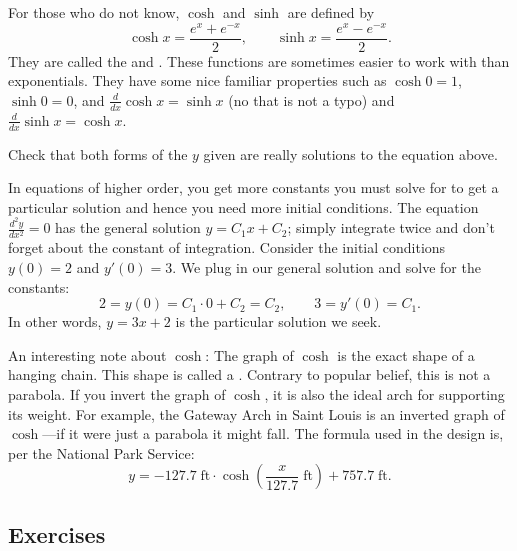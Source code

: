 For those who do not know, $\cosh$ and $\sinh$ are defined by
\begin{equation*}
\cosh x = \frac{e^{x} + e^{-x}}{2} , \qquad
\sinh x = \frac{e^{x} - e^{-x}}{2} .
\end{equation*}
They are called the
\emph{}
and
\emph{}.
These functions are sometimes easier to
work with than exponentials.  They have some nice familiar
properties such as
$\cosh 0 = 1$, $\sinh 0 = 0$, and $\frac{d}{dx} \cosh x = \sinh x$ (no that is
not a typo)
and $\frac{d}{dx} \sinh x = \cosh x$.

\begin{exercise}
Check that both forms of the $y$ given are
really solutions to the equation above.
\end{exercise}

\begin{example}
In equations of higher order, you get more constants you must solve for to
get a particular solution and hence you need more initial conditions.
The equation $\frac{d^2y}{dx^2} = 0$ has the
general solution $y = C_1 x + C_2$; simply integrate twice and don't forget
about the constant of integration.  Consider the initial conditions $y(0) =
2$ and $y'(0) = 3$.  We plug in our general solution and solve for the
constants:
\begin{equation*}
2 = y(0) = C_1 \cdot 0 + C_2 = C_2, \qquad
3 = y'(0) = C_1 .
\end{equation*}
In other words, $y = 3x + 2$ is the particular solution we seek.
\end{example}


An interesting note about $\cosh$:  The graph of $\cosh$ is the exact shape
of a hanging chain.  This shape is called
a \emph{}.
Contrary to popular belief, this is not a
parabola.  If you invert the graph of $\cosh$, it is also the ideal arch for
supporting its weight.
For example, the Gateway Arch in Saint Louis is an inverted graph of
$\cosh$---if it were just a parabola it might fall.  The formula
used in the design is,
per the National Park Service:
\begin{equation*}
y = -127.7 \; \textrm{ft} \cdot \cosh\left(\frac{x}{127.7}  \;
\textrm{ft}\right) + 757.7 \; \textrm{ft} .
\end{equation*}


\subsection{Exercises}

